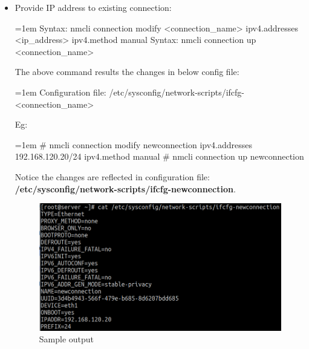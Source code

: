 \begin{flushleft}
\begin{itemize}
\begin{itemize}
		\bigskip
		\bigskip
		\item Provide IP address to existing connection:
		\begin{tcolorbox}[breakable,notitle,boxrule=-0pt,colback=pink,colframe=pink]
			\color{black}
			\font=1em
			Syntax: nmcli connection modify <connection\_name> ipv4.addresses <ip\_address> ipv4.method manual
			\newline
			\newline
			Syntax: nmcli connection up <connection\_name>
			\font=4pt
		\end{tcolorbox}

		The above command results the changes in below config file:
		\begin{tcolorbox}[breakable,notitle,boxrule=-0pt,colback=pink,colframe=pink]
			\color{black}
			\font=1em
			Configuration file:
			\newline
			/etc/sysconfig/network-scripts/ifcfg-<connection\_name>
			\font=4pt
		\end{tcolorbox}
		
		Eg:	
		\begin{tcolorbox}[breakable,notitle,boxrule=-0pt,colback=black,colframe=black]
			\font=1em
			\color{green}
			\# nmcli connection modify newconnection ipv4.addresses 192.168.120.20/24 ipv4.method
			\color{green}
			 manual
			\newline
			\newline
			\color{green}
			\# nmcli connection up newconnection
			\font=4pt
		\end{tcolorbox}
		
		Notice the changes are reflected in configuration file: \textbf{/etc/sysconfig/network-scripts/ifcfg-newconnection}.
		\begin{figure}[h!]
			\centering
			\includegraphics[scale=.35]{content/chapter14/images/networkscript.png}
			\caption{Sample output}
			\label{fig:sample}
		\end{figure}		
	

\end{itemize}
\end{itemize}
\end{flushleft}
